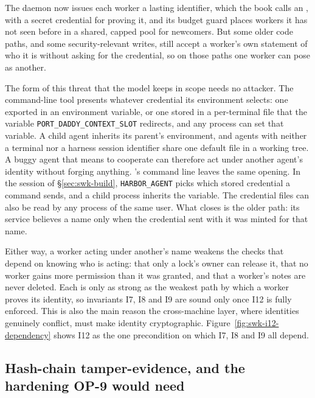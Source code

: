 \documentclass[11pt,a4paper]{article}
\theoremstyle{definition}
\theoremstyle{remark}
\begin{document}
The daemon now issues each worker a lasting identifier, which the book calls an
, with a secret credential for proving it, and its budget guard
places workers it has not seen before in a shared, capped pool for newcomers. But
some older code paths, and some security-relevant writes, still accept a worker's
own statement of who it is without asking for the credential, so on those paths one
worker can pose as another.

The form of this threat that the model keeps in scope needs no attacker. The
command-line tool presents whatever credential its environment selects: one
exported in an environment variable, or one stored in a per-terminal file that
the variable \texttt{PORT\_DADDY\_CONTEXT\_SLOT} redirects, and any process can
set that variable. A child agent inherits its parent's environment, and agents
with neither a terminal nor a harness session identifier share one default file
in a working tree. A buggy agent that means to cooperate can therefore act under
another agent's identity without forging anything. \pdkernelname{}'s
command line leaves the same opening. In the session of
\S\ref{sec:swk-build}, \texttt{HARBOR\_AGENT} picks which stored credential
a command sends, and a child process inherits the variable. The credential
files can also be read by any process of the same user. What \pdkernelname{}
closes is the older path: its service believes a name only when the
credential sent with it was minted for that name.

Either way, a worker acting under another's name weakens the checks that depend
on knowing who is acting: that only a lock's owner can release it, that no worker gains more
permission than it was granted, and that a worker's notes are never deleted. Each
is only as strong as the weakest path by which a worker proves its identity, so
invariants I7, I8 and I9 are sound only once I12 is fully enforced. This is also
the main reason the cross-machine layer, where identities genuinely conflict, must
make identity cryptographic. Figure~\ref{fig:swk-i12-dependency} shows I12 as the
one precondition on which I7, I8 and I9 all depend.



\subsection{Hash-chain tamper-evidence, and the hardening OP-9 would need}
\label{sec:merkle}
\end{document}
